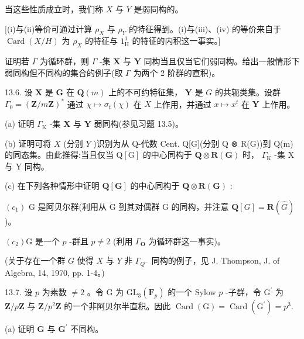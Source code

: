 \documentclass[10pt]{article}
\begin{document}
当这些性质成立时，我们称 \(X\) 与 \(Y\) 是弱同构的。

[(i)与(ii)等价可通过计算 \({\rho }_{X}\) 与 \({\rho }_{Y}\) 的特征得到。(i)与(iii)、(iv) 的等价来自于 \(\operatorname{Card}\left( {X/H}\right)\) 为 \({\rho }_{X}\) 的特征与 \({1}_{\mathrm{H}}^{1}\) 的特征的内积这一事实。]

证明若 \(\Gamma\) 为循环群，则 \(\Gamma\) -集 \(\mathbf{X}\) 与 \(\mathbf{Y}\) 同构当且仅当它们弱同构。给出一般情形下弱同构但不同构的集合的例子(取 \(\Gamma\) 为两个 2 阶群的直积)。

13.6. 设 \(\mathbf{X}\) 是 \(\mathbf{G}\) 在 \(\mathbf{Q}\left( m\right)\) 上的不可约特征集， \(\mathbf{Y}\) 是 \(G\) 的共轭类集。设群 \({\Gamma }_{0} = {\left( \mathbf{Z}/m\mathbf{Z}\right) }^{ * }\) 通过 \(\chi  \mapsto  {\sigma }_{t}\left( \chi \right)\) 在 \(X\) 上作用，并通过 \(x \mapsto  {x}^{t}\) 在 \(\mathbf{Y}\) 上作用。

(a) 证明 \({\Gamma }_{\mathrm{K}}\) -集 \(\mathbf{X}\) 与 \(\mathbf{Y}\) 弱同构(参见习题 13.5)。

(b) 证明可将 \(X\) (分别 \(Y\) )识别为从 Q-代数 Cent. Q[G](分别 Q ⊗ R(G))到 Q(m) 的同态集。由此推得:当且仅当 \(\mathrm{Q}\left\lbrack  \mathrm{G}\right\rbrack\) 的中心同构于 \(\mathbf{Q} \otimes  \mathbf{R}\left( \mathbf{G}\right)\) 时， \({\Gamma }_{\mathrm{K}}\) -集 \(\mathrm{X}\) 与 \(\mathrm{Y}\) 同构。

(c) 在下列各种情形中证明 \(\mathbf{Q}\left\lbrack  \mathbf{G}\right\rbrack\) 的中心同构于 \(\mathbf{Q} \otimes  \mathbf{R}\left( \mathbf{G}\right)\) :

\(\left( {c}_{1}\right)\) G 是阿贝尔群(利用从 G 到其对偶群 G 的同构，并注意 \(\mathbf{Q}\left\lbrack  G\right\rbrack   = \mathbf{R}\left( \widehat{G}\right)\) )。

\(\left( {c}_{2}\right) \mathrm{G}\) 是一个 \(p\) -群且 \(p \neq  2\) (利用 \({\Gamma }_{\mathbf{O}}\) 为循环群这一事实)。

(关于存在一个群 \(G\) 使得 \(X\) 与 \(Y\) 非 \({\Gamma }_{{Q}^{ - }}\) 同构的例子，见 J. Thompson, J. of Algebra, 14, 1970, pp. 1-4。)

13.7. 设 \(p\) 为素数 \(\neq  2\) 。令 \(\mathrm{G}\) 为 \({\mathrm{{GL}}}_{3}\left( {\mathbf{F}}_{p}\right)\) 的一个 Sylow \(p\) -子群，令 \({\mathrm{G}}^{\prime }\) 为 \(\mathbf{Z}/p\mathbf{Z}\) 与 \(\mathbf{Z}/{p}^{2}\mathbf{Z}\) 的一个非阿贝尔半直积。因此 \(\operatorname{Card}\left( \mathrm{G}\right)  = \operatorname{Card}\left( {\mathrm{G}}^{\prime }\right)  = {p}^{3}.\)

(a) 证明 \(\mathbf{G}\) 与 \({\mathbf{G}}^{\prime }\) 不同构。
\end{document}
